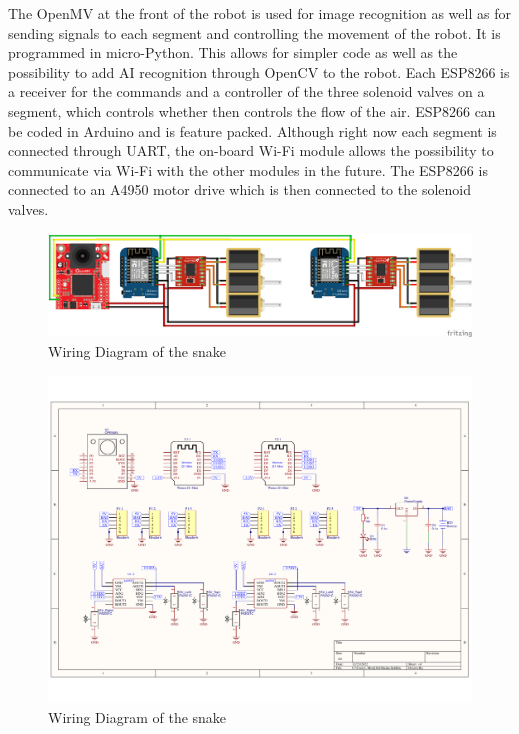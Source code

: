 \documentclass[twoside]{article}
\begin{document}
The OpenMV at the front of the robot is used for image recognition as well as for sending signals to each segment and controlling the movement of the robot. It is programmed in micro-Python. This allows for simpler code as well as the possibility to add AI recognition through OpenCV to the robot. Each ESP8266 is a receiver for the commands and a controller of the three solenoid valves on a segment, which controls whether then controls the flow of the air. ESP8266 can be coded in Arduino and is feature packed. Although right now each segment is connected through UART, the on-board Wi-Fi module allows the possibility to communicate via Wi-Fi with the other modules in the future. The ESP8266 is connected to an A4950 motor drive which is then connected to the solenoid valves. 


\begin{figure} [H]
	\centering
	\includegraphics[width=\linewidth]{wiring_diagram}
	\caption{Wiring Diagram of the snake}
\end{figure}
\begin{figure} [H]
\centering
	\includegraphics[width=\linewidth]{electric circuit diagram}
	\caption{Wiring Diagram of the snake}
\end{figure}
\end{document}
